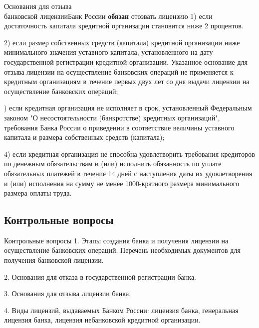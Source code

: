 \documentclass[_Banking_p1.tex]{subfiles}
\begin{document}
\begin{frame}[allowframebreaks]{Основания для отзыва\\ банковской лицензии}{Банк России \textbf{обязан} отозвать лицензию}
1) если достаточность капитала кредитной организации становится ниже 2 процентов.

2) если размер собственных средств (капитала) кредитной организации ниже минимального значения уставного капитала, установленного на дату государственной регистрации кредитной организации. Указанное основание для отзыва лицензии на осуществление банковских операций не применяется к кредитным организациям в течение первых двух лет со дня выдачи лицензии на осуществление банковских операций;

) если кредитная организация не исполняет в срок, установленный Федеральным законом "О несостоятельности (банкротстве) кредитных организаций", требования Банка России о приведении в соответствие величины уставного капитала и размера собственных средств (капитала);

4) если кредитная организация не способна удовлетворить требования кредиторов по денежным обязательствам и (или) исполнить обязанность по уплате обязательных платежей в течение 14 дней с наступления даты их удовлетворения и (или) исполнения на сумму не менее 1000-кратного размера минимального размера оплаты труда.
\end{frame}
\subsection{Контрольные вопросы}
\begin{frame}{Контрольные вопросы}
1. Этапы создания банка и получения лицензии на осуществление банковских операций. Перечень необходимых документов для получения банковской лицензии.

2. Основания для отказа в государственной регистрации банка.

3. Основания для отзыва лицензии банка.

4. Виды лицензий, выдаваемых Банком России: лицензия банка, генеральная лицензия банка, лицензия небанковской кредитной организации.
\end{frame}

\end{document}
